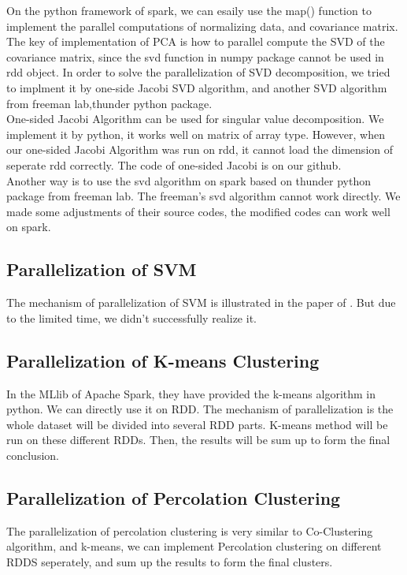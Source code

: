 \documentclass[a4paper]{article}
\begin{document}
On the python framework of spark, we can esaily use the map() function to implement the parallel computations of normalizing data, and covariance matrix. The key of implementation of PCA is how to parallel compute the SVD of the covariance matrix, since the svd function in numpy package cannot be used in rdd object. In order to solve the parallelization of SVD decomposition, we tried to implment it by one-side Jacobi SVD algorithm, and another SVD algorithm from freeman lab,thunder python package.\\
One-sided Jacobi Algorithm can be used for singular value decomposition\cite{Jacobi}. We implement it by python, it works well on matrix of array type. However, when our one-sided Jacobi Algorithm was run on rdd, it cannot load the dimension of seperate rdd correctly. The code of one-sided Jacobi is on our github. \\
Another way is to use the svd algorithm on spark based on thunder python package from freeman lab. The freeman's svd algorithm cannot work directly. We made some adjustments of their source codes, the modified codes can work well on spark. 

\subsection{Parallelization of SVM}

The mechanism of parallelization of SVM is illustrated in the paper of \cite{SVM}. But due to the limited time, we didn't successfully realize it.

\subsection{Parallelization of K-means Clustering}

In the MLlib of Apache Spark, they have provided the k-means algorithm in python. We can directly use it on RDD. The mechanism of parallelization is the whole dataset will be divided into several RDD parts. K-means method will be run on these different RDDs. Then, the results will be sum up to form the final conclusion.

\subsection{Parallelization of Percolation Clustering}

The parallelization of percolation clustering is very similar to Co-Clustering algorithm, and k-means, we can implement Percolation clustering on different RDDS seperately, and sum up the results to form the final clusters. 
\end{document}
